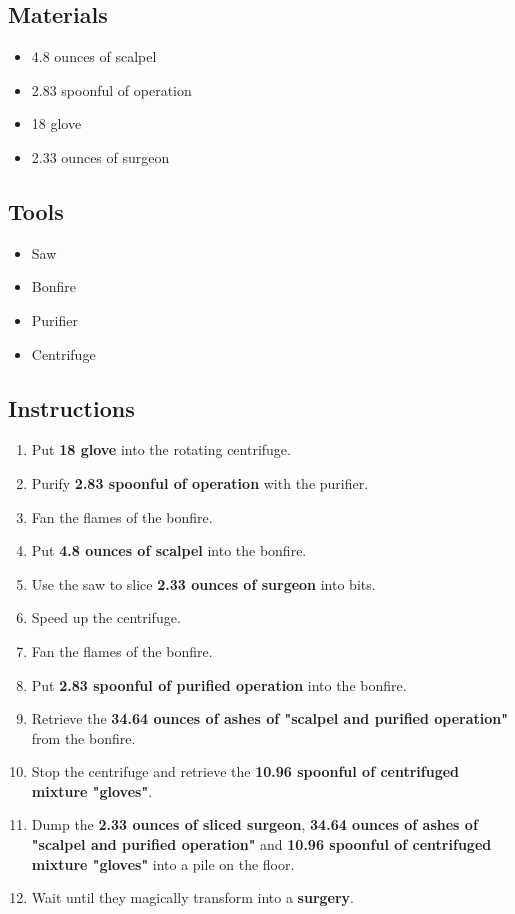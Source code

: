 \documentclass{article}
\begin{document}
\subsection{Materials}\begin{itemize}
\item 
4.8 ounces of scalpel
\item 
2.83 spoonful of operation
\item 
18 glove
\item 
2.33 ounces of surgeon
\end{itemize}
\subsection{Tools}\begin{itemize}
\item 
Saw
\item 
Bonfire
\item 
Purifier
\item 
Centrifuge
\end{itemize}
\subsection{Instructions}\begin{enumerate}
\item 
Put \textbf{18 glove} into the rotating centrifuge.
\item 
Purify \textbf{2.83 spoonful of operation} with the purifier.
\item 
Fan the flames of the bonfire.
\item 
Put \textbf{4.8 ounces of scalpel} into the bonfire.
\item 
Use the saw to slice \textbf{2.33 ounces of surgeon} into bits.
\item 
Speed up the centrifuge.
\item 
Fan the flames of the bonfire.
\item 
Put \textbf{2.83 spoonful of purified operation} into the bonfire.
\item 
Retrieve the \textbf{34.64 ounces of ashes of "scalpel and purified operation"} from the bonfire.
\item 
Stop the centrifuge and retrieve the \textbf{10.96 spoonful of centrifuged mixture "gloves"}.
\item 
Dump the \textbf{2.33 ounces of sliced surgeon}, \textbf{34.64 ounces of ashes of "scalpel and purified operation"} and \textbf{10.96 spoonful of centrifuged mixture "gloves"} into a pile on the floor.
\item 
Wait until they magically transform into a \textbf{surgery}.
\end{enumerate}
\newpage
\end{document}
